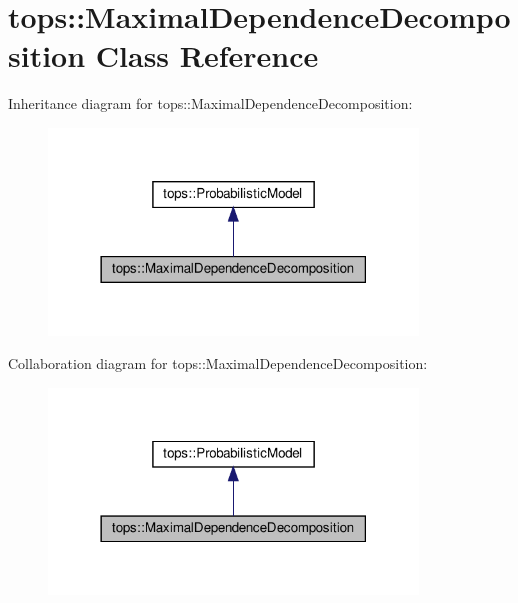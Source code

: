 \hypertarget{classtops_1_1MaximalDependenceDecomposition}{}\section{tops\+:\+:Maximal\+Dependence\+Decomposition Class Reference}
\label{classtops_1_1MaximalDependenceDecomposition}


Inheritance diagram for tops\+:\+:Maximal\+Dependence\+Decomposition\+:
\nopagebreak
\begin{figure}[H]
\begin{center}
\leavevmode
\includegraphics[width=278pt]{classtops_1_1MaximalDependenceDecomposition__inherit__graph}
\end{center}
\end{figure}


Collaboration diagram for tops\+:\+:Maximal\+Dependence\+Decomposition\+:
\nopagebreak
\begin{figure}[H]
\begin{center}
\leavevmode
\includegraphics[width=278pt]{classtops_1_1MaximalDependenceDecomposition__coll__graph}
\end{center}
\end{figure}
